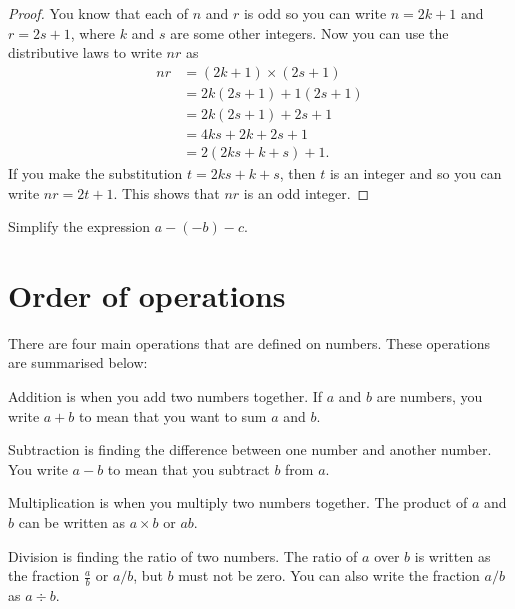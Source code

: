 \documentclass[a4paper,oneside,12pt]{article}
\begin{document}
\begin{proof}
You know that each of $n$ and $r$ is odd so you can write
$n = 2k + 1$ and $r = 2s + 1$, where $k$ and $s$ are some other
integers.  Now you can use the distributive laws to write $nr$ as
\begin{align*}
nr
&=
(2k + 1) \times (2s + 1) \\[4pt]
&=
2k(2s + 1) + 1(2s + 1) \\[4pt]
&=
2k(2s + 1) + 2s + 1 \\[4pt]
&=
4ks + 2k + 2s + 1 \\[4pt]
&=
2(2ks + k + s) + 1.
\end{align*}
If you make the substitution $t = 2ks + k + s$, then $t$ is an integer
and so you can write $nr = 2t + 1$.  This shows that $nr$ is an odd
integer.
\end{proof}

\begin{exercise}
Simplify the expression $a - (-b) - c$.
\end{exercise}




\section{Order of operations}

There are four main operations that are defined on numbers.  These
operations are summarised below:
\begin{packedenumeral}
\item Addition is when you add two numbers together.  If $a$ and $b$
  are numbers, you write $a + b$ to mean that you want to sum $a$ and
  $b$.

\item Subtraction is finding the difference between one number and
  another number.  You write $a - b$ to mean that you subtract $b$
  from $a$.

\item Multiplication is when you multiply two numbers together.  The
  product of $a$ and $b$ can be written as $a \times b$ or $ab$.

\item Division is finding the ratio of two numbers.  The ratio of $a$
  over $b$ is written as the fraction $\frac{a}{b}$ or $a/b$, but $b$
  must not be zero.  You can also write the fraction $a/b$ as
  $a \div b$.
\end{packedenumeral}
\end{document}
